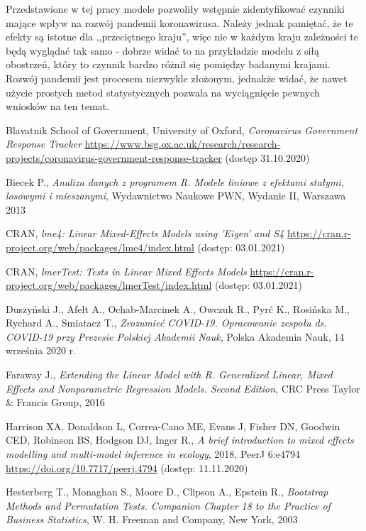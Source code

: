 \documentclass[12pt]{mwbk}
\theoremstyle{plain}
\theoremstyle{definition}
\theoremstyle{definition}
\begin{document}
Przedstawione w tej pracy modele pozwoliły wstępnie zidentyfikować czynniki mające wpływ na rozwój pandemii koronawirusa. Należy jednak pamiętać, że te efekty są istotne dla ,,przeciętnego kraju'', więc nie w każdym kraju zależności te będą wyglądać tak samo - dobrze widać to na przykładzie modelu z siłą obostrzeń, który to czynnik bardzo różnił się pomiędzy badanymi krajami. Rozwój pandemii jest procesem niezwykle złożonym, jednakże widać, że nawet użycie prostych metod statystycznych pozwala na wyciągnięcie pewnych wniosków na ten temat.

\begin{thebibliography}{99}

 Blavatnik School of Government, University of Oxford, \emph{Coronavirus Government Response Tracker} \url{https://www.bsg.ox.ac.uk/research/research-projects/coronavirus-government-response-tracker} (dostęp 31.10.2020)

 Biecek P., \emph{Analiza danych z programem R. Modele liniowe z efektami stałymi, losowymi i mieszanymi}, Wydawnictwo Naukowe PWN, Wydanie II, Warszawa 2013

 CRAN, \emph{lme4: Linear Mixed-Effects Models using 'Eigen' and S4} \url{https://cran.r-project.org/web/packages/lme4/index.html} (dostęp: 03.01.2021)

 CRAN, \emph{lmerTest: Tests in Linear Mixed Effects Models} \url{https://cran.r-project.org/web/packages/lmerTest/index.html} (dostęp: 03.01.2021)

  Duszyński J., Afelt A.,  Ochab-Marcinek A.,
Owczuk R.,  Pyrć K.,  Rosińska M.,
Rychard A.,  Smiatacz T., \emph{Zrozumieć COVID-19. Opracowanie zespołu ds. COVID-19 przy Prezesie Polskiej Akademii Nauk}, Polska Akademia Nauk, 14 września 2020 r.

 Faraway J., \emph{Extending the Linear Model with R. Generalized Linear, Mixed Effects and Nonparametric Regression Models. Second Edition}, CRC Press Taylor \& Francis  Group, 2016

  Harrison XA, Donaldson L, Correa-Cano ME, Evans J, Fisher DN, Goodwin CED, Robinson BS, Hodgson DJ, Inger R., \emph{A brief introduction to mixed effects modelling and multi-model inference in ecology}, 2018, PeerJ 6:e4794 \url{https://doi.org/10.7717/peerj.4794} (dostęp: 11.11.2020)

 Hesterberg T.,  Monaghan S., Moore D., Clipson A., Epstein R., \emph{Bootstrap Methods and Permutation Tests. Companion Chapter 18 to the Practice of Business Statistics}, W. H. Freeman and Company, New York, 2003



\end{thebibliography}
\end{document}
